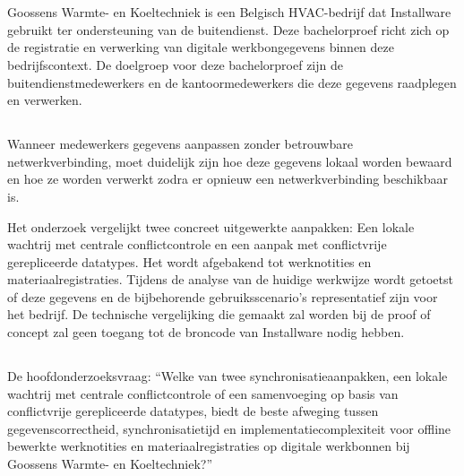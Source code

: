 
\chapter{}%
\label{ch:inleiding}

Goossens Warmte- en Koeltechniek is een Belgisch HVAC-bedrijf dat Installware gebruikt ter ondersteuning van de buitendienst.
Deze bachelorproef richt zich op de registratie en verwerking van digitale werkbongegevens binnen deze bedrijfscontext.
De doelgroep voor deze bachelorproef zijn de buitendienstmedewerkers en de kantoormedewerkers die deze gegevens
raadplegen en verwerken.

\section{}%
\label{sec:probleemstelling}

Wanneer medewerkers gegevens aanpassen zonder betrouwbare netwerkverbinding,
moet duidelijk zijn hoe deze gegevens lokaal worden bewaard en hoe ze worden
verwerkt zodra er opnieuw een netwerkverbinding beschikbaar is.

Het onderzoek vergelijkt twee concreet uitgewerkte aanpakken:
Een lokale wachtrij met centrale conflictcontrole en een aanpak met conflictvrije gerepliceerde datatypes.
Het wordt afgebakend tot werknotities en materiaalregistraties. Tijdens de analyse van de huidige werkwijze
wordt getoetst of deze gegevens en de bijbehorende gebruiksscenario’s representatief zijn voor het bedrijf.
De technische vergelijking die gemaakt zal worden bij de proof of concept zal geen toegang tot de broncode van Installware nodig hebben.

\section{}%
\label{sec:onderzoeksvraag}

De hoofdonderzoeksvraag: “Welke van twee synchronisatieaanpakken, een lokale wachtrij met centrale conflictcontrole of een samenvoeging op basis van conflictvrije gerepliceerde datatypes, biedt de beste afweging tussen gegevenscorrectheid, synchronisatietijd en implementatiecomplexiteit voor offline bewerkte werknotities en materiaalregistraties op digitale werkbonnen bij Goossens Warmte- en Koeltechniek?”

